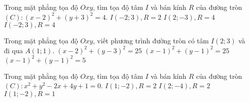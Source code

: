 \begin{ex}%
Trong mặt phẳng tọa độ $Oxy$, tìm tọa độ tâm $I$ và bán kính $R$ của đường tròn $(C): (x-2)^2+(y+3)^2=4$.
{$I(-2;3), R=2$}
{$I(2;-3), R=4$}
{$I(-2;3), R=4$}
\end{ex}

\begin{ex}%
	Trong mặt phẳng tọa độ $Oxy$, viết phương trình đường tròn có tâm $I(2;3)$ và đi qua $A(1;1)$.
	{$(x-2)^2+(y-3)^2=25$}
	{$(x-1)^2+(y-1)^2=25$}
	{$(x-1)^2+(y-1)^2=5$}
\end{ex}
\begin{ex}%
	Trong mặt phẳng tọa độ $Oxy$, tìm tọa độ tâm $I$ và bán kính $R$ của đường tròn $(C): x^2+y^2-2x+4y+1=0$.
	{\True $I(1;-2), R=2$}
	{$I(2;-4), R=2$}
	{$I(1;-2), R=1$}
\end{ex}

